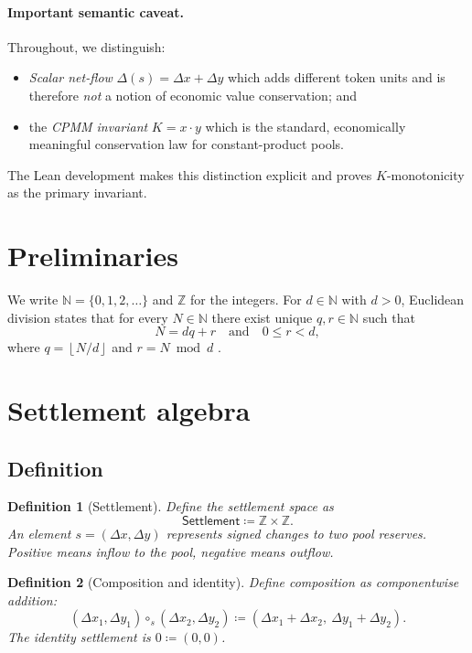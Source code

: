\documentclass[11pt]{article}
\newtheorem{definition}{Definition}
\theoremstyle{remark}
\newcommand{\Z}{\mathbb{Z}}
\newcommand{\N}{\mathbb{N}}
\begin{document}
\paragraph{Important semantic caveat.}
Throughout, we distinguish:
\begin{itemize}[leftmargin=2em]
  \item \emph{Scalar net-flow} $\Delta(s)=\Delta x + \Delta y$ which adds different token units and is therefore
        \emph{not} a notion of economic value conservation; and
  \item the \emph{CPMM invariant} $K=x\cdot y$ which is the standard, economically meaningful conservation law for constant-product pools.
\end{itemize}
The Lean development makes this distinction explicit and proves $K$-monotonicity as the primary invariant.

\section{Preliminaries}
\label{sec:prelim}

We write $\N=\{0,1,2,\dots\}$ and $\Z$ for the integers.
For $d\in\N$ with $d>0$, Euclidean division states that for every $N\in\N$ there exist unique
$q,r\in\N$ such that
\begin{equation}
  N = d q + r \quad\text{and}\quad 0 \le r < d,
  \label{eq:euclid}
\end{equation}
where $q = \left\lfloor N/d \right\rfloor$ and $r = N \bmod d$ \cite{euclid}.

\section{Settlement algebra}
\label{sec:settlement-algebra}

\subsection{Definition}

\begin{definition}[Settlement]
Define the \emph{settlement space} as
\[
  \mathsf{Settlement} \coloneqq \Z \times \Z.
\]
An element $s=(\Delta x,\Delta y)$ represents signed changes to two pool reserves.
Positive means \emph{inflow to the pool}, negative means \emph{outflow}.
\end{definition}

\begin{definition}[Composition and identity]
Define composition as componentwise addition:
\[
  (\Delta x_1,\Delta y_1) \circ_s (\Delta x_2,\Delta y_2)
  \coloneqq (\Delta x_1+\Delta x_2,\ \Delta y_1+\Delta y_2).
\]
The identity settlement is $0\coloneqq (0,0)$.
\end{definition}
\end{document}
